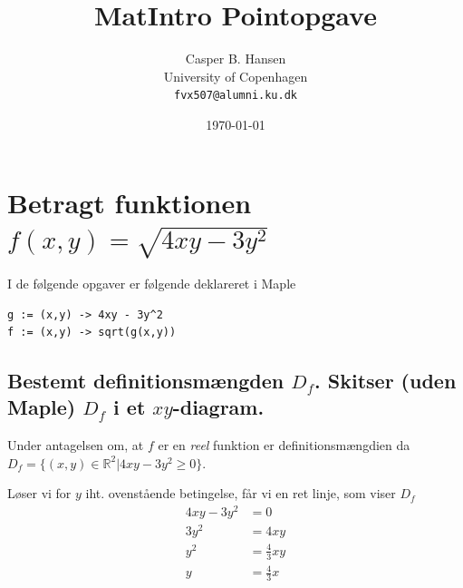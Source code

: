 \documentclass[11pt,a4paper]{article}
\title{MatIntro Pointopgave \assignmentnumber}
\author
{
    Casper B. Hansen\\
    University of Copenhagen\\
    {\tt fvx507@alumni.ku.dk}
}
\date{\today}
\begin{document}


\section
{
    \mdseries
    Betragt funktionen $f(x,y) = \sqrt{4xy - 3y^2}$
}
I de følgende opgaver er følgende deklareret i Maple
\begin{lstlisting}
g := (x,y) -> 4xy - 3y^2
f := (x,y) -> sqrt(g(x,y))
\end{lstlisting}

\begin{multicols}{2}
    
    \subsection
    {
        \mdseries
        Bestemt definitionsmængden $D_f$. Skitser (uden Maple) $D_f$ i et
        $xy$-diagram.
    }
    Under antagelsen om, at $f$ er en {\it reel} funktion er
    definitionsmængdien da $D_f = \{ (x,y) \in \mathbb{R}^2 | 4xy - 3y^2 \geq
    0 \}$.

    Løser vi for $y$ iht. ovenstående betingelse, får vi en ret linje, som
    viser $D_f$
    \begin{align}
        4xy - 3y^2 &= 0 \\
        3y^2 &= 4xy \\
        y^2 &= \frac{4}{3}xy \\
        y &= \frac{4}{3}x
    \end{align}

    \begin{figure}[H]
        \centering
\end{figure}
\end{multicols}
\end{document}
